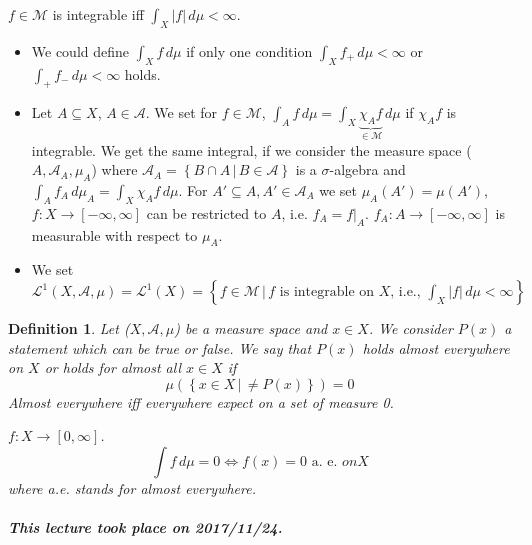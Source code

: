 \documentclass{article}
\newtheorem{definition}{Definition}  \numberwithin{definition}{section}
\newcommand{\setdef}[2]{\left\{\left.#1\,\right|\,#2\right\}}
\newcommand{\card}[1]{\left|#1\right|}
\newcommand{\dateref}[1]{\paragraph{\textit{This lecture took place on #1.}}}
\begin{document}
$f \in \mathcal M$ is integrable iff $\int_X \card{f} \, d\mu < \infty$.
\begin{itemize}
  \item We could define $\int_X f \, d\mu$ if only one condition $\int_X f_+ \, d\mu < \infty$ or $\int_+ f_- \, d\mu < \infty$ holds.
  \item
    Let $A \subseteq X$, $A \in \mathcal A$. We set for $f \in \mathcal M$, $\int_A f\, d\mu = \int_X \underbrace{\chi_A f}_{\in \mathcal M} \, d\mu$
    if $\chi_A f$ is integrable. We get the same integral, if we consider the measure space ($A, \mathcal A_A, \mu_A$) where
    $\mathcal A_A = \setdef{B \cap A}{B \in \mathcal A}$ is a $\sigma$-algebra and
    $\int_A f_A \, d\mu_A = \int_X \chi_A f \, d\mu$.
    For $A' \subseteq A, A' \in \mathcal A_A$ we set $\mu_A(A') = \mu(A')$,
    $f: X \to [-\infty, \infty]$ can be restricted to $A$, i.e. $f_A = \left.f\right|_A$.
    $f_A: A \to [-\infty, \infty]$ is measurable with respect to $\mu_A$.
  \item %
    We set $\mathcal L^1(X, \mathcal A, \mu) = \mathcal L^1(X) = \setdef{f \in \mathcal M}{f \text{ is integrable on $X$, i.e., } \int_X \card{f} \, d\mu < \infty}$
\end{itemize}

\begin{definition}
  Let ($X, \mathcal A, \mu$) be a measure space and $x \in X$.
  We consider $P(x)$ a statement which can be true or false.
  We say that $P(x)$ \emph{holds almost everywhere on $X$} or \emph{holds for almost all $x \in X$} if
  \[ \mu(\setdef{x \in X}{\neq P(x)}) = 0 \]
  Almost everywhere iff everywhere expect on a set of measure 0.

  $f: X \to [0, \infty]$.
  \[ \int f\, d\mu = 0 \iff f(x) = 0 \text{ a. e. } on X \]
  where a.e. stands for \emph{almost everywhere}.
\end{definition}

\dateref{2017/11/24}
\end{document}
